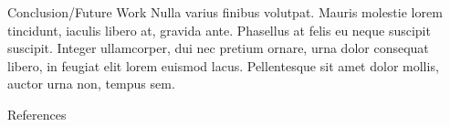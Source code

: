 \documentclass[final]{beamer}
\newlength{\sepwidth}
\newlength{\colwidth}
\newcommand{\separatorcolumn}{\begin{column}{\sepwidth}\end{column}}
\begin{document}
\begin{frame}[t]
\begin{columns}[t]
\begin{column}{\colwidth}
\begin{block}{Conclusion/Future Work}
    Nulla varius finibus volutpat. Mauris molestie lorem tincidunt, iaculis
    libero at, gravida ante. Phasellus at felis eu neque suscipit suscipit.
    Integer ullamcorper, dui nec pretium ornare, urna dolor consequat libero,
    in feugiat elit lorem euismod lacus. Pellentesque sit amet dolor mollis,
    auctor urna non, tempus sem.

  \end{block}

  \begin{block}{References}

    \nocite{*}
    \footnotesize{}

  \end{block}

\end{column}

\separatorcolumn
\end{columns}
\end{frame}
\end{document}
